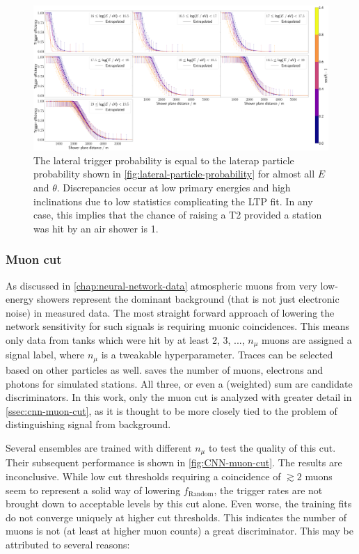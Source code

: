 \begin{figure}
	\centering
	\includegraphics[width=1\textwidth]{./plots/ideal_classifier_LTP.png}
	\caption{The lateral trigger probability is equal to the laterap particle probability shown in \autoref{fig:lateral-particle-probability} for almost all 
	$E$ and $\theta$. Discrepancies occur at low primary energies and high inclinations due to low statistics complicating the LTP fit. In any case, this implies 
	that the chance of raising a T2 provided a station was hit by an air shower is 1.}
	\label{fig:NN-LPP}
\end{figure}

\subsubsection{Muon cut}

As discussed in \autoref{chap:neural-network-data} atmospheric muons from very low-energy showers represent the dominant background (that is not just electronic 
noise) in measured data. The most straight forward approach of lowering the network sensitivity for such signals is requiring muonic coincidences. This means only 
data from tanks which were hit by at least 2, 3, ..., $n_\mu$ muons are assigned a signal label, where $n_\mu$ is a tweakable hyperparameter. Traces can be 
selected based on other particles as well. \Offline saves the number of muons, electrons and photons for simulated stations. All three, or even a (weighted) sum
are candidate discriminators. In this work, only the muon cut is analyzed with greater detail in \autoref{ssec:cnn-muon-cut}, as it is thought to be more closely 
tied to the problem of distinguishing signal from background.

Several ensembles are trained with different $n_\mu$ to test the quality of this cut. Their subsequent performance is shown in \autoref{fig:CNN-muon-cut}. The 
results are inconclusive. While low cut thresholds requiring a coincidence of $\gtrsim 2$ muons seem to represent a solid way of lowering $f_\text{Random}$, the 
trigger rates are not brought down to acceptable levels by this cut alone. Even worse, the training fits do not converge uniquely at higher cut thresholds.
This indicates the number of muons is not (at least at higher muon counts) a great discriminator. This may be attributed to several reasons:

